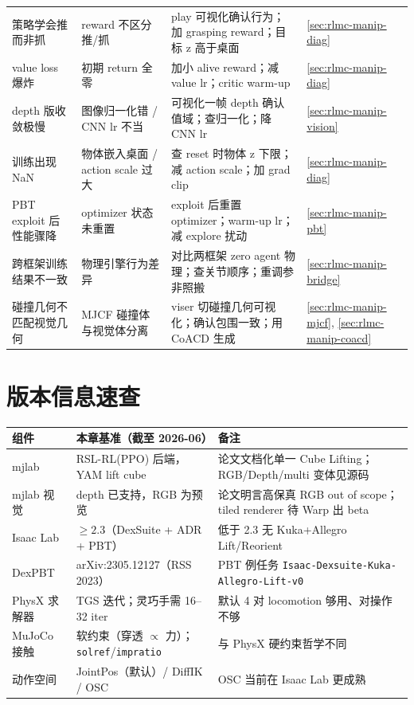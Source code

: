 \begin{center}
\begin{tabular}{@{}p{3.2cm}p{3.0cm}p{4.4cm}l@{}}
策略学会推而非抓 & reward 不区分推/抓 & play 可视化确认行为；加 grasping reward；目标 z 高于桌面 & \cref{sec:rlmc-manip-diag} \\
value loss 爆炸 & 初期 return 全零 & 加小 alive reward；减 value lr；critic warm-up & \cref{sec:rlmc-manip-diag} \\
depth 版收敛极慢 & 图像归一化错 / CNN lr 不当 & 可视化一帧 depth 确认值域；查归一化；降 CNN lr & \cref{sec:rlmc-manip-vision} \\
训练出现 NaN & 物体嵌入桌面 / action scale 过大 & 查 reset 时物体 z 下限；减 action scale；加 grad clip & \cref{sec:rlmc-manip-diag} \\
PBT exploit 后性能骤降 & optimizer 状态未重置 & exploit 后重置 optimizer；warm-up lr；减 explore 扰动 & \cref{sec:rlmc-manip-pbt} \\
跨框架训练结果不一致 & 物理引擎行为差异 & 对比两框架 zero agent 物理；查关节顺序；重调参非照搬 & \cref{sec:rlmc-manip-bridge} \\
碰撞几何不匹配视觉几何 & MJCF 碰撞体与视觉体分离 & viser 切碰撞几何可视化；确认包围一致；用 CoACD 生成 & \cref{sec:rlmc-manip-mjcf}, \cref{sec:rlmc-manip-coacd} \\
\bottomrule
\end{tabular}
\end{center}

\section*{版本信息速查}
\label{sec:rlmc-manip-versions}

\begin{center}
\small
\begin{tabular}{@{}lll@{}}
\toprule
组件 & 本章基准（截至 2026-06） & 备注 \\
\midrule
mjlab & RSL-RL(PPO) 后端，YAM lift cube & 论文文档化单一 Cube Lifting；RGB/Depth/multi 变体见源码 \\
mjlab 视觉 & depth 已支持，RGB 为预览 & 论文明言高保真 RGB out of scope；tiled renderer 待 Warp 出 beta \\
Isaac Lab & $\ge 2.3$（DexSuite + ADR + PBT） & 低于 2.3 无 Kuka+Allegro Lift/Reorient \\
DexPBT & arXiv:2305.12127（RSS 2023） & PBT 例任务 \verb|Isaac-Dexsuite-Kuka-Allegro-Lift-v0| \\
PhysX 求解器 & TGS 迭代；灵巧手需 16--32 iter & 默认 4 对 locomotion 够用、对操作不够 \\
MuJoCo 接触 & 软约束（穿透 $\propto$ 力）；\verb|solref|/\verb|impratio| & 与 PhysX 硬约束哲学不同 \\
动作空间 & JointPos（默认）/ DiffIK / OSC & OSC 当前在 Isaac Lab 更成熟 \\
\bottomrule
\end{tabular}
\end{center}

